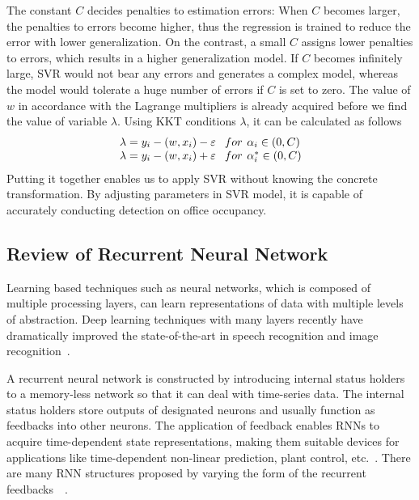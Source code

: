 The constant $C$ decides penalties to estimation errors: When $C$ becomes larger, the penalties to errors become higher, thus the regression is trained to reduce the error with lower generalization. On the contrast, a small $C$ assigns lower penalties to errors, which results in a higher generalization model. If $C$ becomes infinitely large, SVR would not bear any errors and generates a complex model, whereas the model would tolerate a huge number of errors if $C$ is set to zero.
The value of $w$ in accordance with the Lagrange multipliers is already acquired before we find the value of variable $\lambda$. Using KKT conditions $\lambda$, it can be calculated as follows
\[\begin{array}{l}
\lambda = {y_i} - \left( {w,{x_i}} \right) - \varepsilon {\kern 1pt} {\kern 1pt} {\kern 1pt} {\kern 1pt} {\kern 1pt} {\kern 1pt} {\kern 1pt} {\kern 1pt} for{\kern 1pt} {\kern 1pt} {\kern 1pt} {\kern 1pt} {\alpha _i} \in \left( {0,C} \right)\\
\lambda= {y_i} - \left( {w,{x_i}} \right) + \varepsilon {\kern 1pt} {\kern 1pt} {\kern 1pt} {\kern 1pt} {\kern 1pt} {\kern 1pt} {\kern 1pt} {\kern 1pt} for{\kern 1pt} {\kern 1pt} {\kern 1pt} {\kern 1pt} \alpha _i^* \in \left( {0,C} \right)
\end{array}\]
Putting it together enables us to apply SVR without knowing the concrete transformation. By adjusting parameters in SVR model, it is capable of accurately conducting detection on office occupancy.

\subsection{Review of Recurrent Neural Network }
Learning based techniques such as neural networks, which is composed of
multiple processing layers, can learn representations of data with
multiple levels of abstraction. Deep learning techniques with many layers recently
have dramatically improved the state-of-the-art
in speech recognition and image recognition~\cite{schmidhuber2014deep}.

A recurrent neural network is constructed by introducing
internal status holders to a memory-less network so that it can deal
with time-series data. The internal status holders store outputs of
designated neurons and usually function as feedbacks into other
neurons. The application of feedback enables RNNs to acquire
time-dependent state representations, making them suitable devices for
applications like time-dependent non-linear prediction, plant control,
etc.~\cite{haykin2004compreh}. There are many RNN structures
proposed by varying the form of the recurrent
feedbacks~~\cite{elman1990finding,haykin2004compreh,puskorius1996dynamic}.

